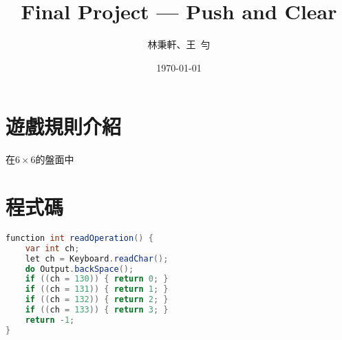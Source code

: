 \documentclass[pstricks, 12pt, a4paper]{article}
\title{Final Project --- Push and Clear}
\author{林秉軒、王\ 勻}
\date{\today}
\begin{document}
\maketitle

\thispagestyle{std}

\section{遊戲規則介紹}
在$6\times 6$的盤面中

\section{程式碼}
\begin{lstlisting}[language=Java]
function int readOperation() {
    var int ch;
    let ch = Keyboard.readChar();
    do Output.backSpace();
    if ((ch = 130)) { return 0; }
    if ((ch = 131)) { return 1; }
    if ((ch = 132)) { return 2; }
    if ((ch = 133)) { return 3; }
    return -1;
}
\end{lstlisting}
\end{document}
